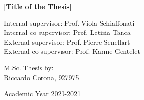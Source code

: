 {\begin{center}
\vspace{1cm}
\LARGE
\textbf{[Title of the Thesis]}\\


\vspace{2cm}

\end{center}


\vspace{2.5cm}
\large
\begin{flushleft}
Internal supervisor: Prof. Viola Schiaffonati \\
Internal co-supervisor: Prof. Letizia Tanca \\
External supervisor: Prof. Pierre Senellart \\
External co-supervisor: Prof. Karine Gentelet \\
\end{flushleft}

\vspace{1cm}

\begin{flushright}
M.Sc. Thesis by: \\
{Riccardo Corona}, 927975 \\
\end{flushright}

\vspace{2cm}

\begin{center}
Academic Year 2020-2021
\end{center} 

\clearpage
}
